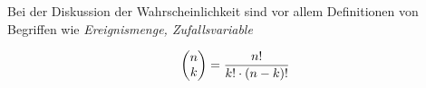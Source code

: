 



\thispagestyle{plain}


Bei der Diskussion der Wahrscheinlichkeit sind vor allem Definitionen von Begriffen wie \emph{Ereignismenge, Zufallsvariable}

$$\begin{pmatrix}n \\ k\end{pmatrix} = \frac{n!}{k! \cdot (n - k)!}$$

